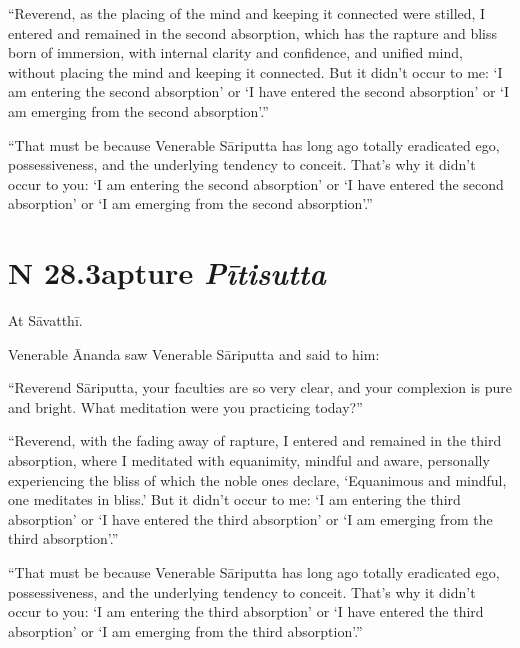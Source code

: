 \documentclass[12pt,openany]{book}%
\newcommand*{\suttatitleacronym}[1]{\smaller[2]{#1}\vspace*{.3em}}
\newcommand*{\suttatitletranslation}[1]{\linebreak{#1}}
\newcommand*{\suttatitleroot}[1]{\linebreak\smaller[2]\itshape{#1}}
\newcommand*{\tocacronym}[1]{\hspace*{-3.3em}{#1}\quad}
\newcommand*{\toctranslation}[1]{#1}
\newcommand*{\tocroot}[1]{(\textit{#1})}
\begin{document}
“Reverend, as the placing of the mind and keeping it connected were stilled, I entered and remained in the second absorption, which has the rapture and bliss born of immersion, with internal clarity and confidence, and unified mind, without placing the mind and keeping it connected. But it didn’t occur to me: ‘I am entering the second absorption’ or ‘I have entered the second absorption’ or ‘I am emerging from the second absorption’.” 

“That must be because Venerable \textsanskrit{Sāriputta} has long ago totally eradicated ego, possessiveness, and the underlying tendency to conceit. That’s why it didn’t occur to you: ‘I am entering the second absorption’ or ‘I have entered the second absorption’ or ‘I am emerging from the second absorption’.” 

%
\section*{{\suttatitleacronym SN 28.3}{\suttatitletranslation Rapture }{\suttatitleroot Pītisutta}}
\addcontentsline{toc}{section}{\tocacronym{SN 28.3} \toctranslation{Rapture } \tocroot{Pītisutta}}

At \textsanskrit{Sāvatthī}. 

Venerable Ānanda saw Venerable \textsanskrit{Sāriputta} and said to him: 

“Reverend \textsanskrit{Sāriputta}, your faculties are so very clear, and your complexion is pure and bright. What meditation were you practicing today?” 

“Reverend, with the fading away of rapture, I entered and remained in the third absorption, where I meditated with equanimity, mindful and aware, personally experiencing the bliss of which the noble ones declare, ‘Equanimous and mindful, one meditates in bliss.’ But it didn’t occur to me: ‘I am entering the third absorption’ or ‘I have entered the third absorption’ or ‘I am emerging from the third absorption’.” 

“That must be because Venerable \textsanskrit{Sāriputta} has long ago totally eradicated ego, possessiveness, and the underlying tendency to conceit. That’s why it didn’t occur to you: ‘I am entering the third absorption’ or ‘I have entered the third absorption’ or ‘I am emerging from the third absorption’.” 
\end{document}
